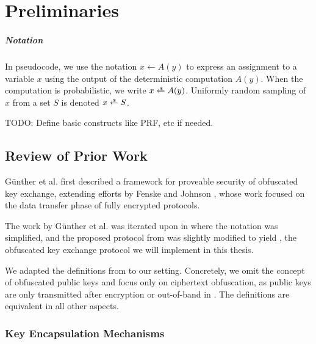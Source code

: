 \chapter{Preliminaries}\label{ch:preliminaries}

\paragraph{Notation}
In pseudocode, we use the notation $x \gets A(y)$ to express an assignment to a variable $x$ using the output of the deterministic computation $A(y)$. When the computation is probabilistic, we write $x \getsr A(y)$.
Uniformly random sampling of $x$ from a set $S$ is denoted $x \getsr S$.

TODO: Define basic constructs like PRF, etc if needed.

\section{Review of Prior Work} \label{sec:review-gsv24}

Günther et al. \cite{CCS:GunSteVei24} first described a framework for proveable security of obfuscated key exchange, extending efforts by Fenske and Johnson \cite{CCS:FenJoh24}, whose work focused on the data transfer phase of fully encrypted protocols.

The work by Günther et al. was iterated upon in \cite{EPRINT:GRSV25} where the notation was simplified, and the proposed protocol from \cite{CCS:GunSteVei24} was slightly modified to yield \drivel, the obfuscated key exchange protocol we will implement in this thesis.

We adapted the definitions from \cite{CCS:GunSteVei24,EPRINT:GRSV25} to our setting. Concretely, we omit the concept of obfuscated public keys and focus only on ciphertext obfuscation, as public keys are only transmitted after encryption or out-of-band in \drivel. The definitions are equivalent in all other aspects.

\subsection{Key Encapsulation Mechanisms}

